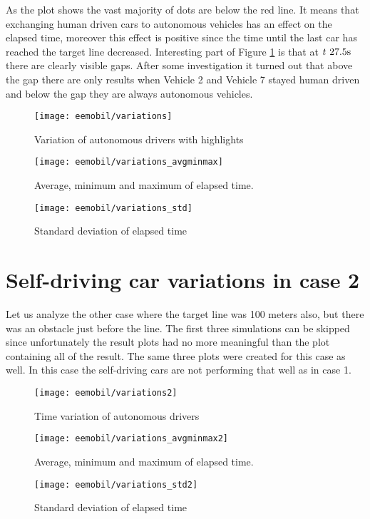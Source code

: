		As the plot shows the vast majority of dots are below the red line. It means that exchanging human driven cars to autonomous vehicles has an effect on the elapsed time, moreover this effect is positive since the time until the last car has reached the target line decreased. Interesting part of Figure \ref{fig:self_variations} is that at $t~27.5\rm s$ there are clearly visible gaps. After some investigation it turned out that above the gap there are only results when Vehicle 2 and Vehicle 7 stayed human driven and below the gap they are always autonomous vehicles.
		\begin{figure}
			\centering
			\texttt{[image: eemobil/variations]}
			\caption{Variation of autonomous drivers with highlights}
			\label{fig:self_variations}
		\end{figure}
		\begin{figure}
			\centering
			\texttt{[image: eemobil/variations\_avgminmax]}
			\caption{Average, minimum and maximum of elapsed time.}
			\label{fig:self_variations_avgminmax}
		\end{figure}
		
		\begin{figure}
			\centering
			\texttt{[image: eemobil/variations\_std]}
			\caption{Standard deviation of elapsed time}
			\label{fig:self_variations_std}
		\end{figure}
	\section{Self-driving car variations in case 2}
		Let us analyze the other case where the target line was 100 meters also, but there was an obstacle just before the line. The first three simulations can be skipped since unfortunately the result plots had no more meaningful than the plot containing all of the result. The same three plots were created for this case as well. In this case the self-driving cars are not performing that well as in case 1. \cite{matlabFFT}
		\begin{figure}
			\centering
			\texttt{[image: eemobil/variations2]}
			\caption{Time variation of autonomous drivers}
			\label{fig:self_variations2}
		\end{figure}
		\begin{figure}
			\centering
			\texttt{[image: eemobil/variations\_avgminmax2]}
			\caption{Average, minimum and maximum of elapsed time.}
			\label{fig:self_variations_avgminmax2}
		\end{figure}
		\begin{figure}
			\centering
			\texttt{[image: eemobil/variations\_std2]}
			\caption{Standard deviation of elapsed time}
			\label{fig:self_variations_std2}
		\end{figure}
